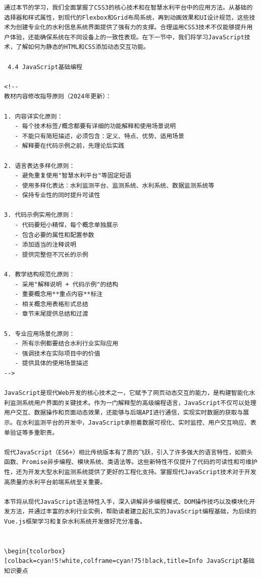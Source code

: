 \begin{lstlisting}
通过本节的学习，我们全面掌握了CSS3的核心技术和在智慧水利平台中的应用方法。从基础的选择器和样式属性，到现代的Flexbox和Grid布局系统，再到动画效果和UI设计规范，这些技术为创建专业化的水利信息系统界面提供了强有力的支撑。合理运用CSS3技术不仅能够提升用户体验，还能确保系统在不同设备上的一致性表现。在下一节中，我们将学习JavaScript技术，了解如何为静态的HTML和CSS添加动态交互功能。

 4.4 JavaScript基础编程

<!--
教材内容修改指导原则（2024年更新）：

1. 内容详实化原则：
   - 每个技术标签/概念都要有详细的功能解释和使用场景说明
   - 不能只有简短描述，必须包含：定义、特点、优势、适用场景
   - 解释要在代码示例之前，先理论后实践

2. 语言表达多样化原则：
   - 避免重复使用"智慧水利平台"等固定短语
   - 使用多样化表达：水利监测平台、监测系统、水利系统、数据监测系统等
   - 保持专业性的同时提升可读性

3. 代码示例实用化原则：
   - 代码要短小精悍，每个概念单独展示
   - 包含必要的属性和配置参数
   - 添加适当的注释说明
   - 提供完整但不冗长的示例

4. 教学结构规范化原则：
   - 采用"解释说明 + 代码示例"的结构
   - 重要概念用**重点内容**标注
   - 相关概念用表格形式总结
   - 章节末尾提供总结和过渡

5. 专业应用场景化原则：
   - 所有示例都要结合水利行业实际应用
   - 强调技术在实际项目中的价值
   - 提供具体的使用场景描述
-->

JavaScript是现代Web开发的核心技术之一，它赋予了网页动态交互的能力，是构建智能化水利监测系统用户界面的关键技术。作为一门解释型的高级编程语言，JavaScript不仅可以处理用户交互、数据操作和页面动态效果，还能够与后端API进行通信，实现实时数据的获取与展示。在水利监测平台的开发中，JavaScript承担着数据可视化、实时监控、用户交互响应、表单验证等多重职责。

现代JavaScript（ES6+）相比传统版本有了质的飞跃，引入了许多强大的语言特性，如箭头函数、Promise异步编程、模块系统、类语法等。这些新特性不仅提升了代码的可读性和可维护性，还为开发大型水利监测系统提供了更好的工程化支持。掌握现代JavaScript技术对于开发高质量的水利平台前端系统至关重要。

本节将从现代JavaScript语法特性入手，深入讲解异步编程模式、DOM操作技巧以及模块化开发方法，并通过丰富的水利行业实例，帮助读者建立起扎实的JavaScript编程基础，为后续的Vue.js框架学习和复杂水利系统开发做好充分准备。


\begin{tcolorbox}[colback=cyan!5!white,colframe=cyan!75!black,title=Info JavaScript基础知识要点
    

\end{lstlisting}
